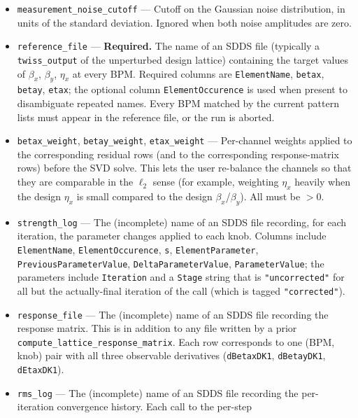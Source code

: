 \documentclass[11pt]{article}
\begin{document}
\begin{itemize}
  measurement---gets a fresh, independent draw, matching how a real machine
  accumulates measurement noise into the response matrix and into the
  residual at the noise floor of the BPM system.  Defaults 0 disable the
  noise.
\item \verb|measurement_noise_cutoff| --- Cutoff on the Gaussian noise
  distribution, in units of the standard deviation.  Ignored when both noise
  amplitudes are zero.
\item \verb|reference_file| --- {\bf Required.}  The name of an SDDS file
  (typically a \verb|twiss_output| of the unperturbed design lattice)
  containing the target values of $\beta_x$, $\beta_y$, $\eta_x$ at every
  BPM.  Required columns are \verb|ElementName|, \verb|betax|, \verb|betay|,
  \verb|etax|; the optional column \verb|ElementOccurence| is used when
  present to disambiguate repeated names.  Every BPM matched by the current
  pattern lists must appear in the reference file, or the run is aborted.
\item \verb|betax_weight|, \verb|betay_weight|, \verb|etax_weight| ---
  Per-channel weights applied to the corresponding residual rows (and to
  the corresponding response-matrix rows) before the SVD solve.  This lets
  the user re-balance the channels so that they are comparable in the
  $\ell_2$ sense (for example, weighting $\eta_x$ heavily when the design
  $\eta_x$ is small compared to the design $\beta_x$/$\beta_y$).  All must
  be $>0$.
\item \verb|strength_log| --- The (incomplete) name of an SDDS file
  recording, for each iteration, the parameter changes applied to each
  knob.  Columns include \verb|ElementName|, \verb|ElementOccurence|,
  \verb|s|, \verb|ElementParameter|, \verb|PreviousParameterValue|,
  \verb|DeltaParameterValue|, \verb|ParameterValue|; the parameters include
  \verb|Iteration| and a \verb|Stage| string that is \verb|"uncorrected"|
  for all but the actually-final iteration of the call (which is tagged
  \verb|"corrected"|).
\item \verb|response_file| --- The (incomplete) name of an SDDS file
  recording the response matrix.  This is in addition to any file written
  by a prior \verb|compute_lattice_response_matrix|.  Each row corresponds
  to one (BPM, knob) pair with all three observable derivatives
  (\verb|dBetaxDK1|, \verb|dBetayDK1|, \verb|dEtaxDK1|).
\item \verb|rms_log| --- The (incomplete) name of an SDDS file recording
  the per-iteration convergence history.  Each call to the per-step

\end{itemize}
\end{document}
